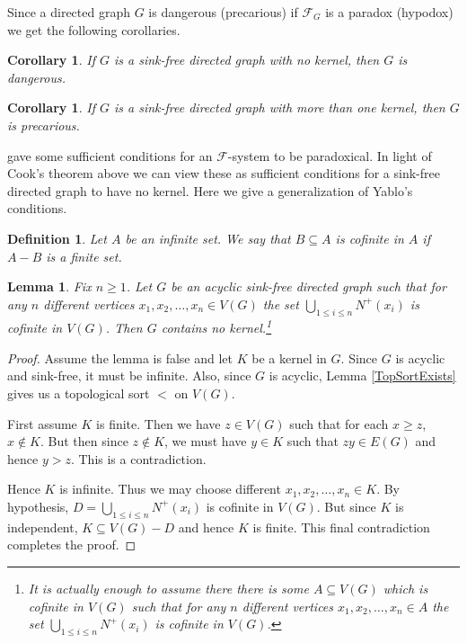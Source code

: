 \documentclass[12pt]{kluwer}
\newtheorem{lem}[thm]{Lemma}
\newtheorem{cor}[thm]{Corollary}
\newtheorem{defn}{Definition}
\theoremstyle{remark}
\newcommand{\fancy}[1]{\mathcal{#1}}
\def\F{\fancy{F}}
\def\F{\fancy{F}}
\begin{document}
Since a directed graph $G$ is dangerous (precarious) if $\F_G$ is a paradox (hypodox) we get the following corollaries.

\begin{cor}
If $G$ is a sink-free directed graph with no kernel, then $G$ is dangerous.
\end{cor}

\begin{cor}
If $G$ is a sink-free directed graph with more than one kernel, then $G$ is precarious.
\end{cor}

\cite{yablo06} gave some sufficient conditions for an $\F$-system to be paradoxical.  In light of Cook's theorem above we can view these as sufficient conditions for a sink-free directed graph to have no kernel.  Here we give a generalization of Yablo's conditions.

\begin{defn}
Let $A$ be an infinite set. We say that $B \subseteq A$ is \emph{cofinite} in $A$ if $A - B$ is a finite set.
\end{defn}

\begin{lem}\label{GeneralizedYabloCondition}
Fix $n \geq 1$.  Let $G$ be an acyclic sink-free directed graph such that for any $n$ different vertices $x_1, x_2, \ldots, x_n \in V(G)$ the set $\bigcup_{1 \leq i \leq n} N^+(x_i)$ is cofinite in $V(G)$.  Then $G$ contains no kernel.\footnote{It is actually enough to assume there there is some $A \subseteq V(G)$ which is cofinite in $V(G)$ such that for any $n$ different vertices $x_1, x_2, \ldots, x_n \in A$ the set $\bigcup_{1 \leq i \leq n} N^+(x_i)$ is cofinite in $V(G)$.}
\end{lem}
\begin{proof}
Assume the lemma is false and let $K$ be a kernel in $G$.  Since $G$ is acyclic and sink-free, it must be infinite.  Also, since $G$ is acyclic, Lemma \ref{TopSortExists} gives us a topological sort $<$ on $V(G)$.\newline 

First assume $K$ is finite.  Then we have $z \in V(G)$ such that for each $x \geq z$, $x \not \in K$.  But then since $z \not \in K$, we must have $y \in K$ such that $zy \in E(G)$ and hence $y > z$. This is a contradiction.\newline

Hence $K$ is infinite. Thus we may choose different $x_1, x_2, \ldots, x_n \in K$.  By hypothesis, $D = \bigcup_{1 \leq i \leq n} N^+(x_i)$ is cofinite in $V(G)$.  But since $K$ is independent, $K \subseteq V(G) - D$ and hence $K$ is finite.  This final contradiction completes the proof.
\end{proof}
\end{document}
